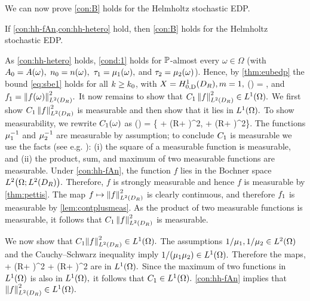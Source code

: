 We can now prove \cref{con:B} holds for the Helmholtz stochastic EDP.

\label{lem:hh-B}
If \cref{con:hh-fAn,con:hh-hetero} hold, then \cref{con:B} holds for the Helmholtz stochastic EDP.
\ele

As \cref{con:hh-hetero} holds,  \cref{cond:1} holds for $\mathbb P$-almost every $\omega \in \Omega$ (with $A_{0} = A(\omega),$ $n_{0} = n(\omega),$ $\tau_{1} = \mu_{1}(\omega),$ and $\tau_{2} = \mu_{2}(\omega)$). Hence, by \cref{thm:eubedp} the bound \eqref{eq:sbe1} holds for all $k \geq k_{0}$, with $X = \HozDDR, m=1,$
\beqs
\Co(\omega) = ,
\eeqs
and $\fo = \NLtDR{f(\omega)}^2.$ It now remains to show that $\Co\,\NLtDR{f}^2 \in \LoO.$ We first show $\Co\,\NLtDR{f}^2$ is measurable and then show that it lies in $\LoO.$ To show measurability, we rewrite $C_{1}(\omega)$ as 
\beqs
\Co(\omega) =  \max\left\{ + \left(R+ \right)^2, + \left(R+ \right)^2\right\}.
\eeqs
The functions $\mu_{1}^{-1}$ and $\mu_{2}^{-1}$ are measurable by assumption; to conclude $C_{1}$ is measurable we use the facts (see e.g. \cite[Theorems 19.C, 20.A]{Ha:74}): (i) the square of a measurable function is measurable, and (ii) the product, sum, and maximum of two measurable functions are measurable. Under 
\cref{con:hh-fAn}, the function $f$ lies in the Bochner space $\LtOLtDR.$ Therefore, $f$ is strongly measurable and hence $f$ is measurable  by \cref{thm:pettis}. The map $f\mapsto\NLtDR{f}^2$ is clearly continuous, and therefore $f_{1}$ is measurable by \cref{lem:contplusmeas}. As the product of two measurable functions is measurable, it follows that $\Co\,\NLtDR{f}^2$ is measurable.

We now show that $\Co\NLtDR{f}^2 \in \LoO.$ The assumptions $1/\muo,1/\mut \in \LtO$ and the Cauchy--Schwarz inequality imply $1/(\muo\mut) \in \LoO.$ Therefore the maps,
\beqs\omega \mapsto {} + \left(R+ \right)^2  \omega \mapsto {} + \left(R+ \right)^2
\eeqs
are in $\LoO.$ Since the maximum of two functions in $\LoO$ is also in $\LoO,$ it follows that $\Co \in \LoO.$ \cref{con:hh-fAn} implies that $\NLtDR{f}^2 \in \LoO.$

